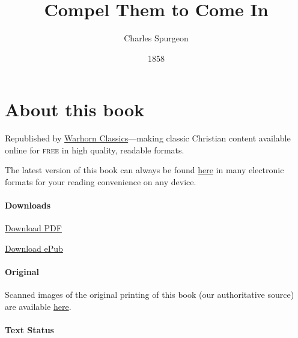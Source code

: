 \documentclass[
]{book}
\title{Compel Them to Come In}
\author{Charles Spurgeon}
\date{1858}
\begin{document}
\maketitle

\mainmatter
{}

{
\setcounter{tocdepth}{1}
\tableofcontents
}
\hypertarget{about-this-book}{%
\chapter*{About this book}\label{about-this-book}}

Republished by \href{https://classics.warhornmedia.com/}{Warhorn Classics}---making classic Christian content available online for \textsc{free} in high quality, readable formats.

The latest version of this book can always be found \href{https://warhornmedia.github.io/spurgeon-compel-them-to-come-in/}{here} in many electronic formats for your reading convenience on any device.

\hypertarget{downloads}{%
\subsubsection*{Downloads}\label{downloads}}

\href{https://warhornmedia.github.io/spurgeon-compel-them-to-come-in//Spurgeon-Compel_Them_to_Come_In.pdf}{Download PDF}

\href{https://warhornmedia.github.io/spurgeon-compel-them-to-come-in//Spurgeon-Compel_Them_to_Come_In.epub}{Download ePub}

\hypertarget{original}{%
\subsubsection*{Original}\label{original}}

Scanned images of the original printing of this book (our authoritative source) are available \href{https://www.spurgeongems.org/sermon/chs227.pdf}{here}.

\hypertarget{text-status}{%
\subsubsection*{Text Status}\label{text-status}}
\end{document}

